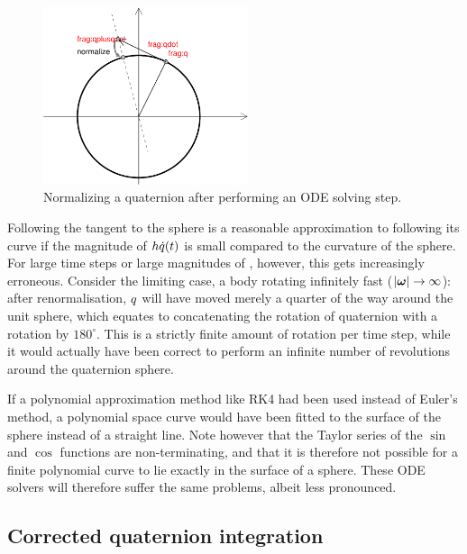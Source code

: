 \begin{figure}
\centerline{\includegraphics[width=6cm]{figures/quaternion1}}
\caption{Normalizing a quaternion after performing an ODE solving step.
    \label{quatNormalizationFigure}}
\end{figure}

Following the tangent to the sphere is a reasonable approximation to following its curve if the
magnitude of $h \dot{q}(t)$ is small compared to the curvature of the sphere.
For large time steps or large magnitudes of \ve{\omega}, however, this gets increasingly
erroneous. Consider the limiting case, a body rotating infinitely fast
($\norm{\ve{\omega}} \rightarrow \infty$): after renormalisation, $q$ will have moved merely
a quarter of the way around the unit sphere, which equates to concatenating the rotation of
quaternion  with a rotation by $180^\circ$. This is a strictly finite amount of rotation
per time step, while it would actually have been correct to perform an infinite number of
revolutions around the quaternion sphere.

If a polynomial approximation method like RK4 had been used instead of Euler's method, a
polynomial space curve would have been fitted to the surface of the sphere instead of a straight
line. Note however that the Taylor series of the $\sin$ and $\cos$ functions are non-terminating,
and that it is therefore not possible for a finite polynomial curve to lie exactly in the surface
of a sphere. These ODE solvers will therefore suffer the same problems, albeit less pronounced.


\subsection{Corrected quaternion integration\label{quatIntegrationDerivation}}

